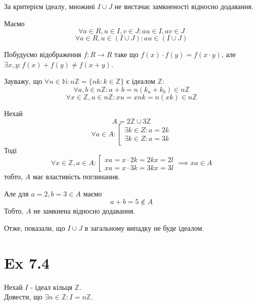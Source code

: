 \documentclass[11pt, a4paper]{article} %
\newcommand{\N}{\mathbb{N}}
\newcommand{\Z}{\mathbb{Z}}
\begin{document}
За критерієм ідеалу, множині $I \cup J$ не вистачає замкненості відносно додавання.

Маємо
\[\forall a\in R, u \in I, v \in J: au \in I, av \in J\]
\[\forall a\in R, u \in (I\cup J): au \in (I \cup J)\]

Побудуємо відображення $f : R \to R$ таке що $f(x)\cdot f(y) = f(x\cdot y)$, але $\exists x,y: f(x)+f(y) \ne f(x+y)$.

Зауважу, що $\forall n\in\N: n\Z = \{nk : k\in \Z\}$ є ідеалом $\Z$:
\[\forall a,b\in n\Z: a+b = n(k_a + k_b) \in n\Z\]
\[\forall x\in\Z, u\in n\Z: xu = xnk = n(xk) \in n\Z\]

Нехай
\[A = 2\Z \cup 3\Z\]
\[\forall a \in A: \left[\begin{array}{l}
    \exists k\in Z: a = 2k\\
    \exists k\in Z: a = 3k
\end{array} \right.\]
Тоді
\[\forall x \in \Z, a \in A: \left[\begin{array}{l}
    xa = x\cdot 2k = 2kx = 2l\\
    xa = x\cdot 3k = 3kx = 3l
\end{array} \right. \implies xa \in A\]
тобто, $A$ має властивість поглинання.

Але для $a=2, b=3 \in A$ маємо
\[a+b = 5 \notin A\]
Тобто, $A$ не замкнена відносно додавання.

Отже, показали, що $I\cup J$ в загальному випадку не буде ідеалом.

\section*{Ex 7.4}
\begin{mdframed}
    Нехай $I$ - ідеал кільця $\Z$.\\
    Довести, що $\exists n\in\Z: I = n\Z$.
\end{mdframed}
\end{document}
